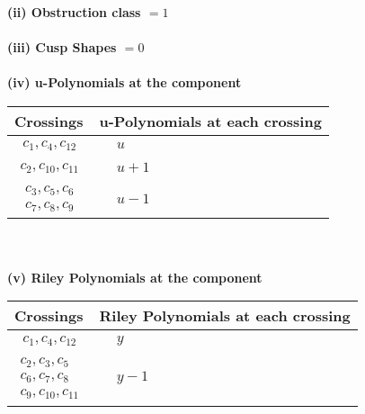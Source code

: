 \documentclass[1p]{elsarticle_modified}
\theoremstyle{definition}
\begin{document}
\flushleft \textbf{(ii) Obstruction class $= 1$}\\~\\
\flushleft \textbf{(iii) Cusp Shapes $= 0$}\\~\\
\newpage\renewcommand{\arraystretch}{1}
\flushleft \textbf{(iv) u-Polynomials at the component}\newline \\
\begin{tabular}{m{50pt}|m{274pt}}
Crossings & \hspace{64pt}u-Polynomials at each crossing \\
\hline $$\begin{aligned}c_{1},c_{4},c_{12}\end{aligned}$$&$\begin{aligned}
&u
\end{aligned}$\\
\hline $$\begin{aligned}c_{2},c_{10},c_{11}\end{aligned}$$&$\begin{aligned}
&u+1
\end{aligned}$\\
\hline $$\begin{aligned}c_{3},c_{5},c_{6}\\c_{7},c_{8},c_{9}\end{aligned}$$&$\begin{aligned}
&u-1
\end{aligned}$\\
\hline
\end{tabular}\\~\\
\newpage\renewcommand{\arraystretch}{1}
\flushleft \textbf{(v) Riley Polynomials at the component}\newline \\
\begin{tabular}{m{50pt}|m{274pt}}
Crossings & \hspace{64pt}Riley Polynomials at each crossing \\
\hline $$\begin{aligned}c_{1},c_{4},c_{12}\end{aligned}$$&$\begin{aligned}
&y
\end{aligned}$\\
\hline $$\begin{aligned}c_{2},c_{3},c_{5}\\c_{6},c_{7},c_{8}\\c_{9},c_{10},c_{11}\end{aligned}$$&$\begin{aligned}
&y-1
\end{aligned}$\\
\hline
\end{tabular}\\~\\
\end{document}
